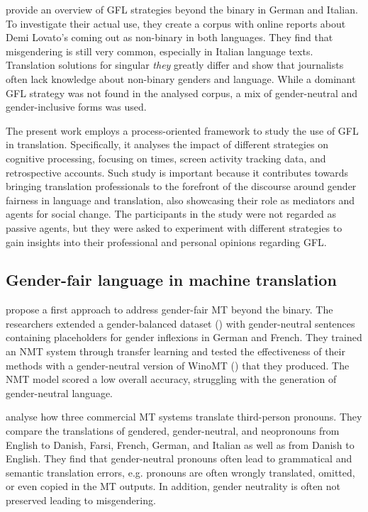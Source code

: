 \textcite{lardellitranslating} provide an overview of GFL strategies beyond the binary in German and Italian. To investigate their actual use, they create a corpus with online reports about Demi Lovato's coming out as non-binary in both languages. They find that misgendering is still very common, especially in Italian language texts. Translation solutions for singular \textit{they} greatly differ and show that journalists often lack knowledge about non-binary genders and language. While a dominant GFL strategy was not found in the analysed corpus, a mix of gender-neutral and gender-inclusive forms was used.

The present work employs a process-oriented framework to study the use of GFL in translation. Specifically, it analyses the impact of different strategies on cognitive processing, focusing on times, screen activity tracking data, and retrospective accounts. Such study is important because it contributes towards bringing translation professionals to the forefront of the discourse around gender fairness in language and translation, also showcasing their role as mediators and agents for social change. The participants in the study were not regarded as passive agents, but they were asked to experiment with different strategies to gain insights into their professional and personal opinions regarding GFL. 


\subsection{Gender-fair language in machine translation}
\textcite{saunders2020neural} propose a first approach to address gender-fair MT beyond the binary. The researchers extended a gender-balanced dataset (\cite{saunders2020reducing}) with gender-neutral sentences containing placeholders for gender inflexions in German and French. They trained an NMT system through transfer learning and tested the effectiveness of their methods with a gender-neutral version of WinoMT (\cite{stanovsky2019evaluating}) that they produced. The NMT model scored a low overall accuracy, struggling with the generation of gender-neutral language.

\textcite{lauscher-etal-2023-em} analyse how three commercial MT systems translate third-person pronouns. They compare the translations of gendered, gender-neutral, and neopronouns from English to Danish, Farsi, French, German, and Italian as well as from Danish to English. They find that gender-neutral pronouns often lead to grammatical and semantic translation errors, e.g. pronouns are often wrongly translated, omitted, or even copied in the MT outputs. In addition, gender neutrality is often not preserved leading to misgendering.


